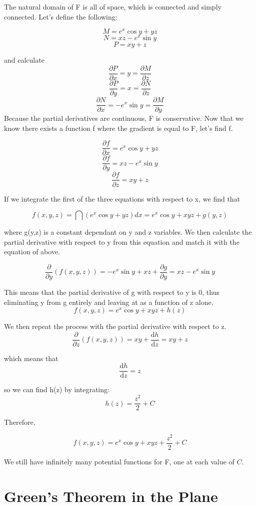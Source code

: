 \begin{solu}
 


The natural domain of F is all of space, which is connected and simply connected. Let's define the following:

\[M=e^x\cos y+yz\]
\[N=xz-e^x\sin y\]
\[P=xy+z\]

and calculate
\[\dfrac{\partial P }{\partial x}=y=\dfrac{\partial M}{\partial z}\]
\[\dfrac{\partial P }{\partial y}=x=\dfrac{\partial N}{\partial z}\]
\[\dfrac{\partial N }{\partial x}=-e^x\sin y=\dfrac{\partial M}{\partial y}\]
Because the partial derivatives are continuous, F is conservative. Now that we know there exists a function f where the gradient is equal to F, let's find f.

\[\dfrac{\partial f }{\partial x}=e^x\cos y+yz\]
\[\dfrac{\partial f }{\partial y}=xz-e^x\sin y\]
\[\dfrac{\partial f }{\partial z}=xy+z\]

If we integrate the first of the three equations with respect to x, we find that 

\[f(x,y,z)=\dint(e^x\cos y+yz)dx=e^x\cos y+xyz+g(y,z)\]

where g(y,z) is a constant dependant on y and z variables. We then calculate the partial derivative with respect to y from this equation and match it with the equation of above. 

\[\dfrac{\partial }{\partial y}(f(x,y,z))=-e^x\sin y+xz+\dfrac{\partial g}{\partial y}=xz-e^x\sin y\]

This means that the partial derivative of g with respect to y is 0, thus eliminating y from g entirely and leaving at as a function of z alone. 
\[f(x,y,z)=e^x\cos y+xyz+h(z)\]

We then repeat the process with the partial derivative with respect to z.
\[\dfrac{\partial }{\partial z}(f(x,y,z))=xy+\dfrac{\mathrm{d} h}{\mathrm{d} z}=xy+z\]

which means that 
\[\dfrac{\mathrm{d} h}{\mathrm{d} z}= z\]

so we can find h(z) by integrating:
\[h(z)=\dfrac{z^2}{2}+C\]

Therefore,

\[f(x,y,z)=e^x\cos y+xyz+\dfrac{z^2}{2}+C\]

We still have infinitely many potential functions for F, one at each value of $C$.
\end{solu}
 
 \section{Green's Theorem in the Plane}
  
